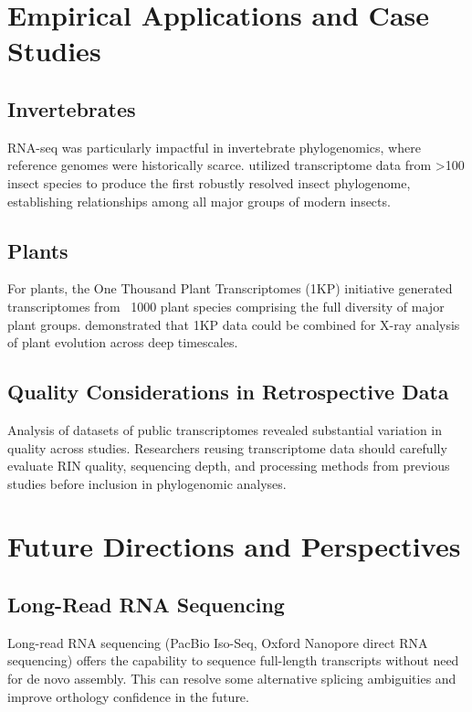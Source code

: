 \section{Empirical Applications and Case Studies}

\subsection{Invertebrates}

RNA-seq was particularly impactful in invertebrate phylogenomics, where reference genomes were historically scarce. \textcite{misof2014} utilized transcriptome data from >100 insect species to produce the first robustly resolved insect phylogenome, establishing relationships among all major groups of modern insects.

\subsection{Plants}

For plants, the One Thousand Plant Transcriptomes (1KP) initiative generated transcriptomes from ~1000 plant species comprising the full diversity of major plant groups. \textcite{onetp2019} demonstrated that 1KP data could be combined for X-ray analysis of plant evolution across deep timescales.

\subsection{Quality Considerations in Retrospective Data}

Analysis of datasets of public transcriptomes revealed substantial variation in quality across studies. Researchers reusing transcriptome data should carefully evaluate RIN quality, sequencing depth, and processing methods from previous studies before inclusion in phylogenomic analyses.

\section{Future Directions and Perspectives}

\subsection{Long-Read RNA Sequencing}

Long-read RNA sequencing (PacBio Iso-Seq, Oxford Nanopore direct RNA sequencing) offers the capability to sequence full-length transcripts without need for de novo assembly. This can resolve some alternative splicing ambiguities and improve orthology confidence in the future.

